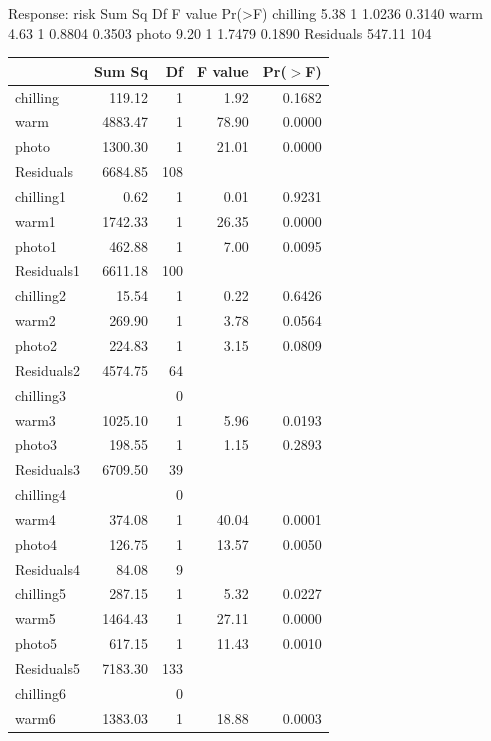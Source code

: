\documentclass{article}\usepackage[]{graphicx}\usepackage[]{color}
\begin{document}
Response: risk
          Sum Sq  Df F value Pr(>F)
chilling    5.38   1  1.0236 0.3140
warm        4.63   1  0.8804 0.3503
photo       9.20   1  1.7479 0.1890
Residuals 547.11 104               
\begin{table}[ht]
\centering
\begin{tabular}{lrrrr}
  \hline
 & Sum Sq & Df & F value & Pr($>$F) \\ 
  \hline
chilling & 119.12 & 1 & 1.92 & 0.1682 \\ 
  warm & 4883.47 & 1 & 78.90 & 0.0000 \\ 
  photo & 1300.30 & 1 & 21.01 & 0.0000 \\ 
  Residuals & 6684.85 & 108 &  &  \\ 
   \hline
chilling1 & 0.62 & 1 & 0.01 & 0.9231 \\ 
  warm1 & 1742.33 & 1 & 26.35 & 0.0000 \\ 
  photo1 & 462.88 & 1 & 7.00 & 0.0095 \\ 
  Residuals1 & 6611.18 & 100 &  &  \\ 
   \hline
chilling2 & 15.54 & 1 & 0.22 & 0.6426 \\ 
  warm2 & 269.90 & 1 & 3.78 & 0.0564 \\ 
  photo2 & 224.83 & 1 & 3.15 & 0.0809 \\ 
  Residuals2 & 4574.75 & 64 &  &  \\ 
   \hline
chilling3 &  & 0 &  &  \\ 
  warm3 & 1025.10 & 1 & 5.96 & 0.0193 \\ 
  photo3 & 198.55 & 1 & 1.15 & 0.2893 \\ 
  Residuals3 & 6709.50 & 39 &  &  \\ 
   \hline
chilling4 &  & 0 &  &  \\ 
  warm4 & 374.08 & 1 & 40.04 & 0.0001 \\ 
  photo4 & 126.75 & 1 & 13.57 & 0.0050 \\ 
  Residuals4 & 84.08 & 9 &  &  \\ 
   \hline
chilling5 & 287.15 & 1 & 5.32 & 0.0227 \\ 
  warm5 & 1464.43 & 1 & 27.11 & 0.0000 \\ 
  photo5 & 617.15 & 1 & 11.43 & 0.0010 \\ 
  Residuals5 & 7183.30 & 133 &  &  \\ 
   \hline
chilling6 &  & 0 &  &  \\ 
  warm6 & 1383.03 & 1 & 18.88 & 0.0003 \\ 

\end{tabular}
\end{table}
\end{document}
